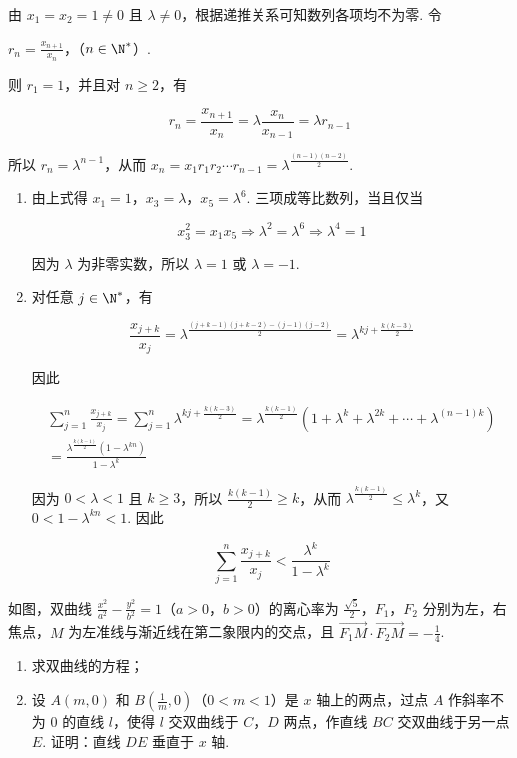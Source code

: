 \begin{solution}
由 \(x_1=x_2=1\ne0\) 且 \(\lambda\ne0\)，根据递推关系可知数列各项均不为零. 令

\(r_n=\frac{x_{n+1}}{x_n}\)，（\(n\in\N^*\)）.

则 \(r_1=1\)，并且对 \(n\geqslant2\)，有

\[
r_n=\frac{x_{n+1}}{x_n}=\lambda\frac{x_n}{x_{n-1}}=\lambda r_{n-1}
\]

所以 \(r_n=\lambda^{n-1}\)，从而
\(x_n=x_1r_1r_2\cdots r_{n-1}=\lambda^{\frac{(n-1)(n-2)}{2}}\).

\begin{enumerate}
\item 由上式得 \(x_1=1\)，\(x_3=\lambda\)，\(x_5=\lambda^{6}\). 三项成等比数列，当且仅当

\[
x_3^{2}=x_1x_5\Longrightarrow \lambda^{2}=\lambda^{6}\Longrightarrow \lambda^{4}=1
\]

因为 \(\lambda\) 为非零实数，所以 \(\lambda=1\) 或 \(\lambda=-1\).

\item 对任意 \(j\in\N^*\)，有

\[
\frac{x_{j+k}}{x_j}=\lambda^{\frac{(j+k-1)(j+k-2)-(j-1)(j-2)}{2}}=\lambda^{kj+\frac{k(k-3)}{2}}
\]

因此

\[
\begin{gathered}
\sum_{j=1}^{n}\frac{x_{j+k}}{x_j}
=\sum_{j=1}^{n}\lambda^{kj+\frac{k(k-3)}{2}}
=\lambda^{\frac{k(k-1)}{2}}\left(1+\lambda^{k}+\lambda^{2k}+\cdots+\lambda^{(n-1)k}\right)\\
=\frac{\lambda^{\frac{k(k-1)}{2}}\left(1-\lambda^{kn}\right)}{1-\lambda^{k}}
\end{gathered}
\]

因为 \(0<\lambda<1\) 且 \(k\geqslant3\)，所以 \(\frac{k(k-1)}{2}\geqslant k\)，从而 \(\lambda^{\frac{k(k-1)}{2}}\leqslant\lambda^{k}\)，又 \(0<1-\lambda^{kn}<1\). 因此

\[
\sum_{j=1}^{n}\frac{x_{j+k}}{x_j}<\frac{\lambda^{k}}{1-\lambda^{k}}
\]
\end{enumerate}
\end{solution}

\begin{problem}
如图，双曲线 \(\frac{x^2}{a^2} - \frac{y^2}{b^2} = 1\)（\(a > 0\)，\(b > 0\)）的离心率为 \(\frac{\sqrt{5}}{2}\)，\(F_1\)，\(F_2\) 分别为左，右焦点，\(M\) 为左准线与渐近线在第二象限内的交点，且 \(\overrightarrow{F_1M} \cdot \overrightarrow{F_2M} = -\frac{1}{4}\).

\begin{enumerate}
\item 求双曲线的方程；
\item 设 \(A(m,0)\) 和 \(B\left(\frac{1}{m},0\right)\)（\(0 < m < 1\)）是 \(x\) 轴上的两点，过点 \(A\) 作斜率不为 \(0\) 的直线 \(l\)，使得 \(l\) 交双曲线于 \(C\)，\(D\) 两点，作直线 \(BC\) 交双曲线于另一点 \(E\). 证明：直线 \(DE\) 垂直于 \(x\) 轴.
\end{enumerate}

\end{problem}


